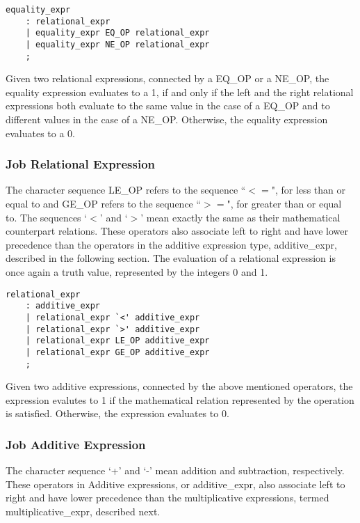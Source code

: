 \documentclass[prodmode,acmtecs]{acmsmall}
\begin{document}
\begin{lstlisting}
equality_expr
	: relational_expr
	| equality_expr EQ_OP relational_expr
	| equality_expr NE_OP relational_expr
	;
\end{lstlisting}

Given two relational expressions, connected by a EQ\_OP or a NE\_OP, 
the equality expression evaluates to a 1, if and only if the left and 
the right relational expressions both evaluate to the same value in the 
case of a EQ\_OP and to different values in the case of a NE\_OP. 
Otherwise, the equality expression evaluates to a 0.

\subsubsection{Job Relational Expression}

The character sequence LE\_OP refers to the sequence ``$<=$", for less 
than or equal to and GE\_OP refers to the sequence ``$>=$", for greater 
than or equal to. The sequences `$<$' and `$>$' mean exactly the same as 
their mathematical counterpart relations. These operators also associate 
left to right and have lower precedence than the operators in the additive 
expression type, additive\_expr, described in the following section. The 
evaluation of a relational expression is once again a truth value, 
represented by the integers 0 and 1. 

\begin{lstlisting}
relational_expr
	: additive_expr
	| relational_expr `<' additive_expr
	| relational_expr `>' additive_expr
	| relational_expr LE_OP additive_expr
	| relational_expr GE_OP additive_expr
	;
\end{lstlisting}

Given two additive expressions, connected by the above mentioned operators, 
the expression evalutes to 1 if the mathematical relation represented by 
the operation is satisfied. Otherwise, the expression evaluates to 0. 

\subsubsection{Job Additive Expression}

The character sequence `+' and `-' mean addition and subtraction, 
respectively. These operators in Additive expressions, or additive\_expr, 
also associate left to right and have lower precedence than the 
multiplicative expressions, termed multiplicative\_expr, described next.
\end{document}
